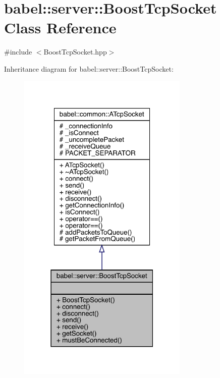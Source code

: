 \hypertarget{classbabel_1_1server_1_1_boost_tcp_socket}{}\section{babel\+:\+:server\+:\+:Boost\+Tcp\+Socket Class Reference}
\label{classbabel_1_1server_1_1_boost_tcp_socket}


{\ttfamily \#include $<$Boost\+Tcp\+Socket.\+hpp$>$}



Inheritance diagram for babel\+:\+:server\+:\+:Boost\+Tcp\+Socket\+:\nopagebreak
\begin{figure}[H]
\begin{center}
\leavevmode
\includegraphics[width=231pt]{classbabel_1_1server_1_1_boost_tcp_socket__inherit__graph}
\end{center}
\end{figure}


